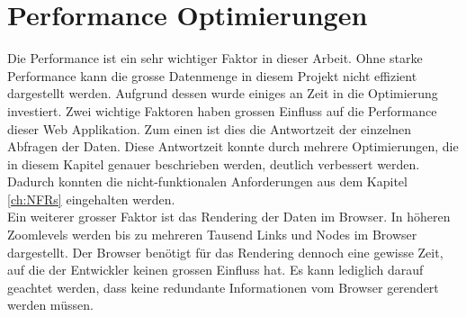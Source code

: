 \section{Performance Optimierungen}
\label{ch:performance}
Die Performance ist ein sehr wichtiger Faktor in dieser Arbeit. Ohne starke Performance kann die grosse Datenmenge in diesem Projekt nicht effizient dargestellt werden. Aufgrund dessen wurde einiges an Zeit in die Optimierung investiert. Zwei wichtige Faktoren haben grossen Einfluss auf die Performance dieser Web Applikation. Zum einen ist dies die Antwortzeit der einzelnen Abfragen der Daten. Diese Antwortzeit konnte durch mehrere Optimierungen, die in diesem Kapitel genauer beschrieben werden, deutlich verbessert werden. Dadurch konnten die nicht-funktionalen Anforderungen aus dem Kapitel \ref{ch:NFRs}  eingehalten werden.\\
Ein weiterer grosser Faktor ist das Rendering der Daten im Browser. In höheren Zoomlevels werden bis zu mehreren Tausend Links und Nodes im Browser dargestellt. Der Browser benötigt für das Rendering dennoch eine gewisse Zeit, auf die der Entwickler keinen grossen Einfluss hat. Es kann lediglich darauf geachtet werden, dass keine redundante Informationen vom Browser gerendert werden müssen.
